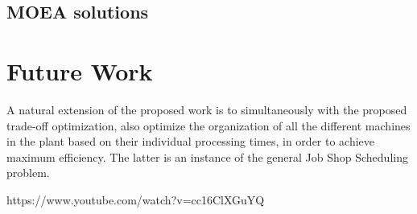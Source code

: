 \documentclass{IEEEtran}
\begin{document}
\subsection{MOEA solutions}

\section{Future Work}
A natural extension of the proposed work is to simultaneously with the proposed trade-off optimization, also optimize the organization of all the different machines in the plant based on their individual processing times, in order to achieve maximum efficiency. The latter is an instance of the general Job Shop Scheduling problem.

\begin{thebibliography}{00}
 https://www.youtube.com/watch?v=cc16ClXGuYQ
\end{thebibliography}
\end{document}
